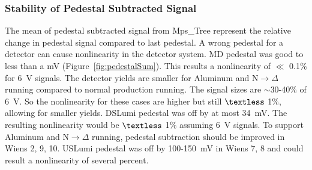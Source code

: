 \subsubsection{Stability of Pedestal Subtracted Signal}
\label{Stability of Pedestal Subtracted Signal}
The mean of pedestal subtracted signal from Mps\_Tree represent the relative change in pedestal signal compared to last pedestal. A wrong pedestal for a detector can cause nonlinearity in the detector system. MD pedestal was good to less than a mV (Figure~\ref{fig:pedestalSum}). This results a nonlinearity of $\ll$ 0.1\% for 6~V signals. The detector yields are smaller for Aluminum and N$\rightarrow\Delta$ running compared to normal production running. The signal sizes are $\sim$30-40\% of 6~V. So the nonlinearity for these cases are higher but still $\textless$ 1\%, allowing for smaller yields. DSLumi pedestal was off by at most 34~mV. The resulting nonlinearity would be $\textless$ 1$\%$ assuming 6~V signals. To support Aluminum and N$\rightarrow\Delta$ running, pedestal subtraction should be improved in Wiens 2, 9, 10.  USLumi pedestal was off by 100-150~mV in Wiens 7, 8 and could result a nonlinearity of several percent.



